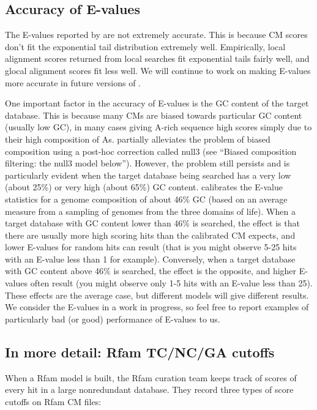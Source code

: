 \subsection{Accuracy of E-values}

The E-values reported by  are not extremely accurate.
This is because CM scores don't fit the exponential tail distribution
extremely well. Empirically, local alignment scores returned from
local searches fit exponential tails fairly well, and glocal alignment
scores fit less well. We will continue to work on making E-values more
accurate in future versions of .

One important factor in the accuracy of E-values is the GC content of
the target database. This is because many CMs are biased towards
particular GC content (usually low GC), in many cases giving A-rich
sequence high scores simply due to their high composition of
As.  partially alleviates the problem of biased
composition using a post-hoc correction called null3 (see ``Biased
composition filtering: the null3 model below''). However, the problem
still persists and is particularly evident when the target database
being searched has a very low (about 25\%) or very high (about 65\%)
GC content.  calibrates the E-value statistics for a
genome composition of about 46\% GC (based on an average measure from
a sampling of genomes from the three domains of life). When a target
database with GC content lower than 46\% is searched, the effect is
that there are usually more high scoring hits than the calibrated CM
expects, and lower E-values for random hits can result (that is you
might observe 5-25 hits with an E-value less than 1 for
example). Conversely, when a target database with GC content above
46\% is searched, the effect is the opposite, and higher E-values
often result (you might observe only 1-5 hits with an E-value less than
25). These effects are the average case, but different models will
give different results. We consider the E-values in  a
work in progress, so feel free to report examples of particularly bad
(or good) performance of E-values to us.

\subsection{In more detail: Rfam TC/NC/GA cutoffs}

When a Rfam model is built, the Rfam curation team keeps track of
scores of every hit in a large nonredundant database. They record
three types of score cutoffs on Rfam CM files:

